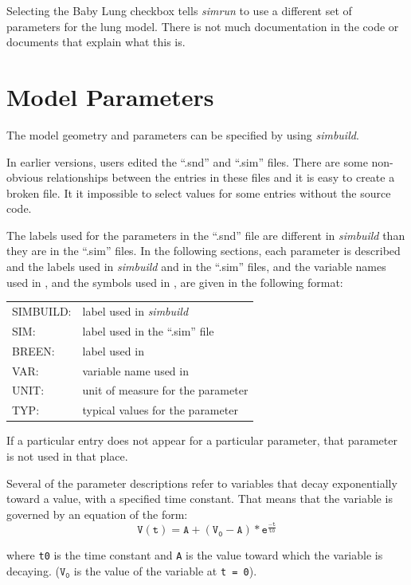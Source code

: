 \documentclass[12pt,openany,oneside]{book}
\newcommand{\ticode}[1]{\texttt{#1}}
\newcommand{\tmcode}[1]{\mathtt{#1}}
\newcommand{\prog}[1]{\textit{{#1}}}
\newcommand{\ext}[1]{{{``.#1''}}}
\begin{document}
Selecting the Baby Lung checkbox tells \prog{simrun} to use a different
set of parameters for the lung model. There is not much documentation in
the code or documents that explain what this is.

\clearpage
\section{Model Parameters}
\label{Parameters}
The model geometry and parameters can be specified by using 
\prog{simbuild}. 

In earlier versions, users edited the \ext{snd} and \ext{sim} files. There
are some non-obvious relationships between the entries in these files and
it is easy to create a broken file. It it impossible to select values
for some entries without the source code.

The labels used for the parameters in the \ext{snd} file are different in 
\prog{simbuild} than they are in the \ext{sim} files. In the following sections, each
parameter is described and the labels used in \prog{simbuild} and in the
\ext{sim} files, and the variable names used in \citet {macgregor1987neural},
and the symbols used in \citet {breenhybrid2003}, are given in 
the following format:

\begin{flushleft}
\begin{tabular}{@{}ll@{}}
SIMBUILD:  &  label used in \prog{simbuild}\\
SIM:  &  label used in the \ext{sim} file\\
BREEN: & label used in \citet {breenhybrid2003} \\
VAR:  &  variable name used in {\citet{macgregor1987neural}} \\
UNIT:  &  unit of measure for the parameter\\
TYP:  &  typical values for the parameter\\
\end{tabular}
\end{flushleft}

If a particular entry does not appear for a particular parameter, that
parameter is not used in that place.

Several of the parameter descriptions refer to variables that decay
exponentially toward a value, with a specified time constant. That
means that the variable is governed by an equation of the form:
$$
\tmcode{V(t) = A + (V_0 - A) * e^{\tfrac{-t}{t0}}}
$$

\noindent
where \ticode{t0} is the time constant and \ticode{A} is the value toward which the
variable is decaying. ($\tmcode{V_0}$ is the value of the variable at
\ticode{t = 0}).
\end{document}
